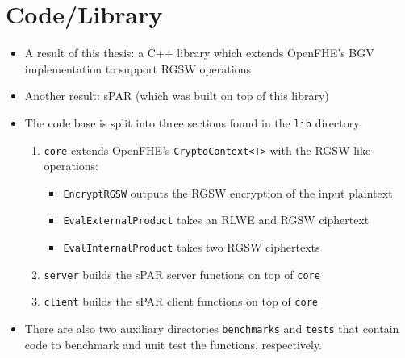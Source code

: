 \newcommand{\corelib}{\texttt{core} }
\newcommand{\serverlib}{\texttt{server} }
\newcommand{\clientlib}{\texttt{client} }

\section{Code/Library}
\begin{itemize}
    \item A result of this thesis: a C++ library which extends OpenFHE's BGV implementation to support RGSW operations
    \item Another result: sPAR (which was built on top of this library)
    \item The code base is split into three sections found in the \texttt{lib} directory:
    \begin{enumerate}
        \item \corelib extends OpenFHE's \texttt{CryptoContext<T>} with the RGSW-like operations:
        \begin{itemize}
            \item \texttt{EncryptRGSW} outputs the RGSW encryption of the input plaintext
            \item \texttt{EvalExternalProduct} takes an RLWE and RGSW ciphertext
            \item \texttt{EvalInternalProduct} takes two RGSW ciphertexts
        \end{itemize}
        \item \serverlib builds the sPAR server functions on top of \corelib
        \item \clientlib builds the sPAR client functions on top of \corelib
    \end{enumerate}
    \item There are also two auxiliary directories \texttt{benchmarks} and \texttt{tests} that contain code to benchmark and unit test the functions, respectively.
\end{itemize}
